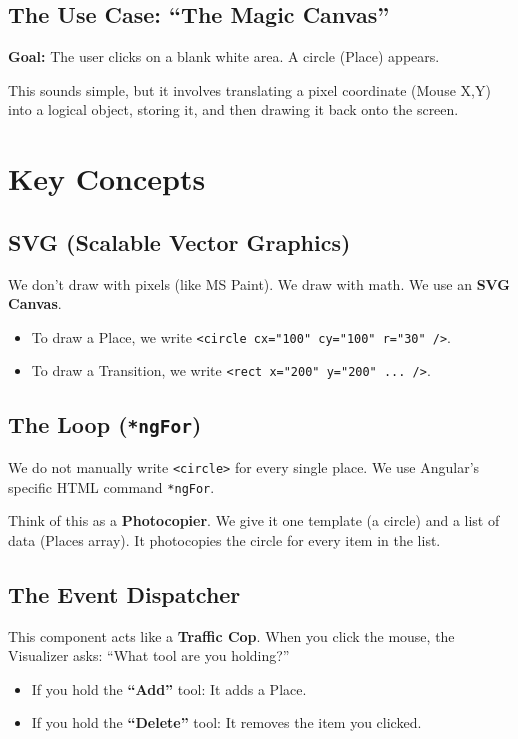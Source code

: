 \documentclass[a4paper,11pt,oneside]{report}
\begin{document}
\subsection{The Use Case: ``The Magic Canvas''}

\textbf{Goal:} The user clicks on a blank white area. A circle (Place) appears.

This sounds simple, but it involves translating a pixel coordinate (Mouse X,Y) into a logical object, storing it, and then drawing it back onto the screen.

\section{Key Concepts}

\subsection{SVG (Scalable Vector Graphics)}

We don't draw with pixels (like MS Paint). We draw with math. We use an \textbf{SVG Canvas}.
\begin{itemize}
    \item To draw a Place, we write \texttt{<circle cx="100" cy="100" r="30" />}.
    \item To draw a Transition, we write \texttt{<rect x="200" y="200" ... />}.
\end{itemize}

\subsection{The Loop (\texttt{*ngFor})}

We do not manually write \texttt{<circle>} for every single place. We use Angular's specific HTML command \texttt{*ngFor}.

Think of this as a \textbf{Photocopier}. We give it one template (a circle) and a list of data (Places array). It photocopies the circle for every item in the list.

\subsection{The Event Dispatcher}

This component acts like a \textbf{Traffic Cop}. When you click the mouse, the Visualizer asks: ``What tool are you holding?''
\begin{itemize}
    \item If you hold the \textbf{``Add''} tool: It adds a Place.
    \item If you hold the \textbf{``Delete''} tool: It removes the item you clicked.
\end{itemize}
\end{document}

